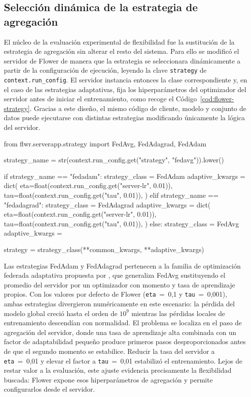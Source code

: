 \subsection{Selección dinámica de la estrategia de agregación}\label{subsec:flex-flower-strategy}

El núcleo de la evaluación experimental de flexibilidad fue la sustitución de la
estrategia de agregación sin alterar el resto del sistema. Para ello se modificó
el servidor de Flower de manera que la estrategia se seleccionara dinámicamente a
partir de la configuración de ejecución, leyendo la clave \texttt{strategy} de
\texttt{context.run_config}. El servidor instancia entonces la clase
correspondiente y, en el caso de las estrategias adaptativas, fija los
hiperparámetros del optimizador del servidor antes de iniciar el entrenamiento,
como recoge el Código~\ref{cod:flower-strategy}. Gracias a este diseño, el mismo
código de cliente, modelo y conjunto de datos puede ejecutarse con distintas
estrategias modificando únicamente la lógica del servidor.

\begin{pythoncode}[title={server\_app.py}, label={cod:flower-strategy}]
from flwr.serverapp.strategy import FedAvg, FedAdagrad, FedAdam

strategy_name = str(context.run_config.get("strategy", "fedavg")).lower()

if strategy_name == "fedadam":
    strategy_class = FedAdam
    adaptive_kwargs = dict(
        eta=float(context.run_config.get("server-lr", 0.01)),
        tau=float(context.run_config.get("tau", 0.01)),
    )
elif strategy_name == "fedadagrad":
    strategy_class = FedAdagrad
    adaptive_kwargs = dict(
        eta=float(context.run_config.get("server-lr", 0.01)),
        tau=float(context.run_config.get("tau", 0.01)),
    )
else:
    strategy_class = FedAvg
    adaptive_kwargs = {}

strategy = strategy_class(**common_kwargs, **adaptive_kwargs)
\end{pythoncode}

Las estrategias FedAdam y FedAdagrad pertenecen a la familia de optimización
federada adaptativa propuesta por \textcite{reddi2021adaptive}, que generaliza
FedAvg sustituyendo el promedio del servidor por un optimizador con momento y tasa
de aprendizaje propios. Con los valores por defecto de Flower
(\texttt{eta}~=~0,1 y \texttt{tau}~=~0,001), ambas estrategias divergieron
numéricamente en este escenario: la pérdida del modelo global creció hasta el
orden de $10^{9}$ mientras las pérdidas locales de entrenamiento descendían con
normalidad. El problema se localiza en el paso de agregación del servidor, donde
una tasa de aprendizaje alta combinada con un factor de adaptabilidad pequeño
produce primeros pasos desproporcionados antes de que el segundo momento se
estabilice. Reducir la tasa del servidor a \texttt{eta}~=~0,01 y elevar el factor
a \texttt{tau}~=~0,01 estabilizó el entrenamiento. Lejos de restar valor a la
evaluación, este ajuste evidencia precisamente la flexibilidad buscada: Flower
expone esos hiperparámetros de agregación y permite configurarlos desde el
servidor.

